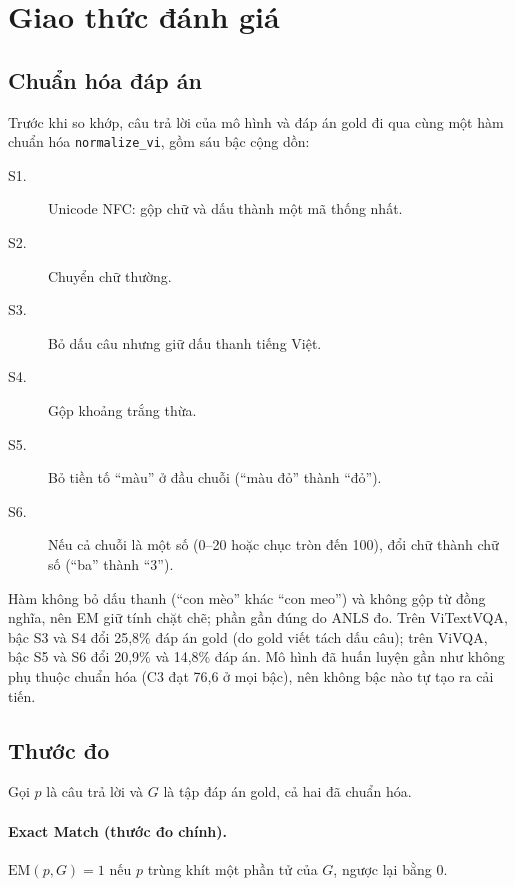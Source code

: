 \section{Giao thức đánh giá}
\label{sec:met-eval}

\subsection{Chuẩn hóa đáp án}
\label{sec:met-norm}

Trước khi so khớp, câu trả lời của mô hình và đáp án gold đi qua cùng một hàm
chuẩn hóa \texttt{normalize\_vi}, gồm sáu bậc cộng dồn:

\begin{description}
  \item[S1.] Unicode NFC: gộp chữ và dấu thành một mã thống nhất.
  \item[S2.] Chuyển chữ thường.
  \item[S3.] Bỏ dấu câu nhưng giữ dấu thanh tiếng Việt.
  \item[S4.] Gộp khoảng trắng thừa.
  \item[S5.] Bỏ tiền tố ``màu'' ở đầu chuỗi (``màu đỏ'' thành ``đỏ'').
  \item[S6.] Nếu cả chuỗi là một số (0--20 hoặc chục tròn đến 100), đổi chữ thành
  chữ số (``ba'' thành ``3'').
\end{description}

Hàm không bỏ dấu thanh (``con mèo'' khác ``con meo'') và không gộp từ đồng nghĩa,
nên EM giữ tính chặt chẽ; phần gần đúng do ANLS đo. Trên ViTextVQA, bậc S3 và S4
đổi 25,8\% đáp án gold (do gold viết tách dấu câu); trên ViVQA, bậc S5 và S6 đổi
20,9\% và 14,8\% đáp án. Mô hình đã huấn luyện gần như không phụ thuộc chuẩn hóa
(C3 đạt 76,6 ở mọi bậc), nên không bậc nào tự tạo ra cải tiến.

\subsection{Thước đo}

Gọi $p$ là câu trả lời và $G$ là tập đáp án gold, cả hai đã chuẩn hóa.

\paragraph{Exact Match (thước đo chính).} $\mathrm{EM}(p, G) = 1$ nếu $p$ trùng
khít một phần tử của $G$, ngược lại bằng 0.

